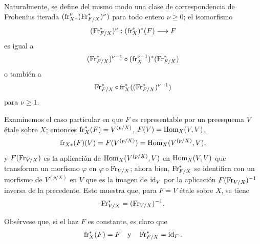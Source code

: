 Naturalmente, se define del mismo modo una clase de correspondencia de Frobenius iterada $(\operatorname{fr}_X^\nu,(\operatorname{Fr}^*_{F/X})^\nu)$ para todo entero $\nu\geq0$; el isomorfismo
\[
(\operatorname{Fr}^*_{F/X})^\nu:(\operatorname{fr}_X^\nu)^*(F)\longrightarrow F
\]
es igual a
\[
(\operatorname{Fr}^*_{F/X})^{\nu-1}\circ (\operatorname{fr}_X^{\nu-1})^*(\operatorname{Fr}^*_{F/X})
\]
o también a
\[
\operatorname{Fr}^*_{F/X}\circ\operatorname{fr}_X^*((\operatorname{Fr}^*_{F/X})^{\nu-1})
\]
para $\nu\geq1$.

Examinemos el caso particular en que $F$ es representable por un preesquema $V$ étale sobre $X$; entonces $\operatorname{fr}_X^*(F)=V^{(p/X)}$, $F(V)=\operatorname{Hom}_X(V,V)$,
\[
\operatorname{fr}_{X*}(F)(V)=F(V^{(p/X)})=\operatorname{Hom}_X(V^{(p/X)},V),
\]
y $F(\operatorname{Fr}_{V/X})$ es la aplicación de $\operatorname{Hom}_X(V^{(p/X)},V)$ en $\operatorname{Hom}_X(V,V)$ que transforma un morfismo $\varphi$ en $\varphi\circ\operatorname{Fr}_{V/X}$; ahora bien, $\operatorname{Fr}^*_{F/X}$ se identifica con un morfismo de $V^{(p/X)}$ en $V$ que es la imagen de $\operatorname{id}_V$ por la aplicación $F(\operatorname{Fr}_{V/X})^{-1}$ inversa de la precedente. Esto muestra que, para $F=V$ étale sobre $X$, se tiene
\[
\operatorname{Fr}^*_{V/X}=(\operatorname{Fr}_{V/X})^{-1}.
\]

Obsérvese que, si el haz $F$ es constante, es claro que
\[
\operatorname{fr}_X^*(F)=F
\quad\text{y}\quad
\operatorname{Fr}^*_{F/X}=\operatorname{id}_F.
\]
